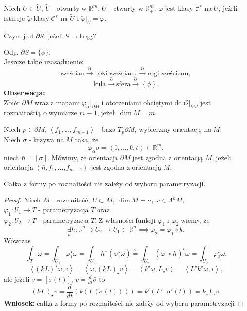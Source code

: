 \documentclass[../main.tex]{subfiles}
\begin{document}
\begin{definicja}
    Niech $U\subset \tilde U$, $\tilde U$ - otwarty w $\mathbb{R}^m$, $U$ - otwarty w $\mathbb{R}^m_+$. $\varphi$ jest klasy $\mathcal{C}^r$ na $U$, jeżeli istnieje $\tilde \varphi$ klasy $\mathcal{C}^r$ na $\tilde U$ i $\tilde \varphi|_U = \varphi$.
\end{definicja}
\begin{pytanie}
    Czym jest $\partial S$, jeżeli $S$ - okrąg?
\end{pytanie}
Odp. $\partial S = \{\phi\}$.\\
Jeszcze takie uzasadnienie:
\[
    \text{sześcian} \overset{\partial}{\to} \text{boki sześcianu} \overset{\partial}{\to} \text{rogi sześcianu}
,\]
\[
    \text{kula} \overset{\partial}{\to} \text{sfera} \overset{\partial}{\to} \left\{ \phi \right\}
.\]
\textbf{Obserwacja:}\\
Zbiór $\partial M$ wraz z mapami $\varphi_\alpha|_{\partial M}$ i otoczeniami obciętymi do $\mathcal{O}|_{\partial M}$ jest rozmaitością o wymiarze $m-1$, jeżeli $\dim M = m$.\\

\pagebreak
\begin{definicja}
Niech  $p\in \partial M$, $\left<f_1,\ldots,f_{m-1} \right>$ - baza $ T_p\partial M$, wybierzmy orientację na $M$.\\
Niech $\sigma$ - krzywa na $M$ taka, że
\[
    \varphi_\alpha\sigma =  \left( 0,\ldots,0,t \right) \in\mathbb{R}^m_+
,\]
niech $\bar{n} = \left[ \sigma \right] $. Mówimy, że orientacja $\partial M$ jest zgodna z orientacją $M$, jeżeli orientacja $\left<\bar{n}, f_1,\ldots,f_{m-1} \right>$ jest zgodna z orientacją $M$.
\end{definicja}

\begin{stw}
    Całka z formy po rozmaitości nie zależy od wyboru parametryzacji.
\end{stw}
\begin{proof}
Niech $M$ - rozmaitość, $U\subset M$, $\dim M = n$, $\omega\in \Lambda^kM$,\\
    $\varphi_1: U_1\to T$ - parametryzacja $T$ oraz \\
    $\varphi_2: U_2\to T$ - parametryzacja $T$. Z własności funkcji  $\varphi_1$ i $\varphi_2$ wiemy, że
\[
\underset{h}{\exists} h: \mathbb{R}^n \supset U_2\to U_1\subset\mathbb{R}^n \implies \varphi_2 = \varphi_1\circ h
.\]
Wówczas
\[
    \int_{T}\omega = \int_{U_1}\varphi_1^\star \omega = \int_{U_2}h^\star\left( \varphi_1^\star\omega \right) \overset{\text{?}}{=} \int_{U_2}(\varphi_1\circ h)^\star\omega = \int_{U_2}\varphi_2^\star\omega
.\]
    \[
        \left<(kL)^\star\omega, v \right> = \left<\omega, (kL)_\star v \right> = \left<k^\star \omega, L_\star v \right> = \left<L^\star k^\star \omega, v \right>
    ,\]
ale jeżeli $v = \left[ \sigma(t) \right]$, $v = \frac{d}{dt}\bar{\sigma}$ to
\[
    (kL)_\star v = \frac{d}{dt}\left( k\left( L\left( \bar{\sigma}(t) \right)  \right)  \right) = k'(L'\cdot \sigma'(t)) = k_\star L_\star v
.\]
\textbf{Wniosek:} całka z formy po rozmaitości nie zależy od wyboru parametryzacji
\end{proof}
\end{document}

